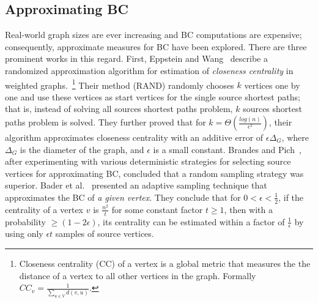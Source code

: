 %
%
\subsection{Approximating BC}
\label{subsec:approximate_bc}
%
Real-world graph sizes are ever increasing and BC computations are expensive;
consequently, approximate measures for BC have been explored.
%
There are three prominent works in this regard.
%
First, Eppstein and Wang~\cite{Eppstein-2004} describe a randomized
approximation algorithm for estimation of \textit{closeness centrality} in
weighted graphs.~\footnote{Closeness centrality (CC) of a vertex is a global
metric that measures the the distance of a vertex to all other vertices in the
graph.
%
Formally $CC_v=\frac{1}{\sum_{u\in{}V}{d(v,u)}}$.}
%
Their method (RAND) randomly chooses $k$ vertices one by one and use these 
vertices as start vertices for the single source shortest paths; that is, 
instead of solving all sources shortest paths problem, $k$ sources shortest
paths problem is solved.
%
They further proved that for $k=\Theta{(\frac{log(n)}{\epsilon{}^2})}$, their
algorithm approximates closeness centrality with an additive error of
$\epsilon{}\Delta{}_{G}$, where $\Delta{}_G$ is the diameter of the graph, and
$\epsilon{}$ is a small constant.
%
Brandes and Pich~\cite{brandes-2007}, after experimenting with various 
deterministic strategies for selecting source vertices for approximating BC,
concluded that a random sampling strategy was superior.
%
Bader et al.~\cite{Bader07:ApproxBC} presented an adaptive sampling technique
that approximates the BC of \textit{a given vertex}.
%
They conclude that for $0<\epsilon{}<\frac{1}{2}$, if the centrality of a vertex
$v$ is $\frac{n^2}{t}$ for some constant factor $t\ge{}1$, then with a 
probability $\ge{}(1-2\epsilon{})$, its centrality can be estimated within a 
factor of $\frac{1}{\epsilon{}}$ by using only $\epsilon{}t$ samples of 
source vertices.
